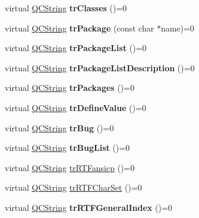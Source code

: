 \begin{DoxyCompactItemize}
\item 
\hypertarget{class_translator_a591927464a08680b5ab81c4c5724a8ea}{virtual \hyperlink{class_q_c_string}{Q\-C\-String} {\bfseries tr\-Classes} ()=0}\label{class_translator_a591927464a08680b5ab81c4c5724a8ea}

\item 
\hypertarget{class_translator_aec5df5ba2dbc3dcaf8f292d9a6a6262f}{virtual \hyperlink{class_q_c_string}{Q\-C\-String} {\bfseries tr\-Package} (const char $\ast$name)=0}\label{class_translator_aec5df5ba2dbc3dcaf8f292d9a6a6262f}

\item 
\hypertarget{class_translator_a919880e3bab6c868fc245bcb6044d3be}{virtual \hyperlink{class_q_c_string}{Q\-C\-String} {\bfseries tr\-Package\-List} ()=0}\label{class_translator_a919880e3bab6c868fc245bcb6044d3be}

\item 
\hypertarget{class_translator_ac1ba34155a23c78804c441a7442d37a9}{virtual \hyperlink{class_q_c_string}{Q\-C\-String} {\bfseries tr\-Package\-List\-Description} ()=0}\label{class_translator_ac1ba34155a23c78804c441a7442d37a9}

\item 
\hypertarget{class_translator_a6a8e30ab54e8768f92270fdab78bffd5}{virtual \hyperlink{class_q_c_string}{Q\-C\-String} {\bfseries tr\-Packages} ()=0}\label{class_translator_a6a8e30ab54e8768f92270fdab78bffd5}

\item 
\hypertarget{class_translator_a7dcf688d8b716a0b5e784a1ab5041179}{virtual \hyperlink{class_q_c_string}{Q\-C\-String} {\bfseries tr\-Define\-Value} ()=0}\label{class_translator_a7dcf688d8b716a0b5e784a1ab5041179}

\item 
\hypertarget{class_translator_a680cee6516692ef7f6d0184cea240123}{virtual \hyperlink{class_q_c_string}{Q\-C\-String} {\bfseries tr\-Bug} ()=0}\label{class_translator_a680cee6516692ef7f6d0184cea240123}

\item 
\hypertarget{class_translator_ad410366413c311bd3831de922a83ea8a}{virtual \hyperlink{class_q_c_string}{Q\-C\-String} {\bfseries tr\-Bug\-List} ()=0}\label{class_translator_ad410366413c311bd3831de922a83ea8a}

\item 
virtual \hyperlink{class_q_c_string}{Q\-C\-String} \hyperlink{class_translator_ad311c4c9f94a1560635b5bef47ce2562}{tr\-R\-T\-Fansicp} ()=0
\item 
virtual \hyperlink{class_q_c_string}{Q\-C\-String} \hyperlink{class_translator_adb781ed8fe17549dcd60a81559a2fb83}{tr\-R\-T\-F\-Char\-Set} ()=0
\item 
\hypertarget{class_translator_a4b77cac2b13bf30087da1b17b7597605}{virtual \hyperlink{class_q_c_string}{Q\-C\-String} {\bfseries tr\-R\-T\-F\-General\-Index} ()=0}\label{class_translator_a4b77cac2b13bf30087da1b17b7597605}


\end{DoxyCompactItemize}
